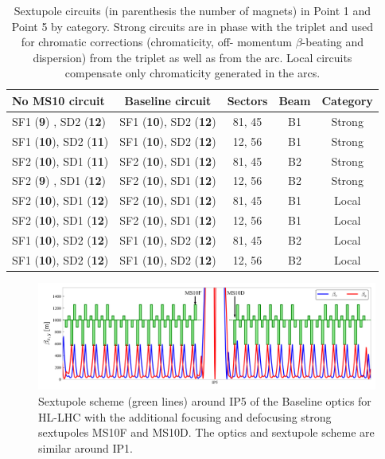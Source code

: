 \documentclass{cernatsnote}
\begin{document}
\begin{table}
\begin{center}
\caption{\label{tab_circuit_ms10}  Sextupole circuits (in parenthesis the number of magnets) in Point 1 and Point 5 by category. Strong circuits are in phase with the triplet and used for chromatic corrections (chromaticity, off- momentum $\beta$-beating and dispersion) from the triplet as well as from the arc. Local circuits compensate only chromaticity generated in the arcs.}
\begin{tabular}{lcccc} \hline
No MS10 circuit  &  Baseline circuit  &   Sectors    &    Beam     &   Category  \\ \hline
SF1 (\textbf{9}) , SD2 (\textbf{12})  &  SF1 (\textbf{10}), SD2 (\textbf{12})  &   81, 45    &    B1     &   Strong  \\ 
SF1 (\textbf{10}), SD2 (\textbf{11})  &  SF1 (\textbf{10}), SD2 (\textbf{12})  &   12, 56    &    B1     &   Strong  \\ 
SF2 (\textbf{10}), SD1 (\textbf{11})  &  SF2 (\textbf{10}), SD1 (\textbf{12})  &   81, 45    &    B2     &   Strong  \\ 
SF2 (\textbf{9}) , SD1 (\textbf{12})  &  SF2 (\textbf{10}), SD1 (\textbf{12})  &   12, 56    &    B2     &   Strong  \\ 
SF2 (\textbf{10}), SD1 (\textbf{12})  &  SF2 (\textbf{10}), SD1 (\textbf{12})  &   81, 45    &    B1     &   Local  \\ 
SF2 (\textbf{10}), SD1 (\textbf{12})  &  SF2 (\textbf{10}), SD1 (\textbf{12})  &   12, 56    &    B1     &   Local  \\ 
SF1 (\textbf{10}), SD2 (\textbf{12})  &  SF1 (\textbf{10}), SD2 (\textbf{12})  &   81, 45    &    B2     &   Local  \\ 
SF1 (\textbf{10}), SD2 (\textbf{12})  &  SF1 (\textbf{10}), SD2 (\textbf{12})  &   12, 56    &    B2     &   Local  \\ \hline
\end{tabular}
\end{center}
\end{table}

\begin{figure}[h!]
\centering
\includegraphics[width=1.0\textwidth]{images/lattice_sext_base.png}
\caption{\label{fig_twiss_base} Sextupole scheme (green lines) around IP5 of the Baseline optics for HL-LHC with the additional focusing and defocusing strong sextupoles MS10F and MS10D. The optics and sextupole scheme are similar around IP1.}
\end{figure}
\end{document}
